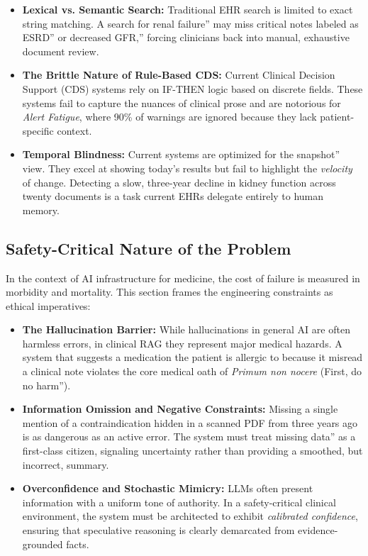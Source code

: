 \begin{itemize} \item \textbf{Lexical vs. Semantic Search:} Traditional EHR search is limited to exact string matching. A search for renal failure'' may miss critical notes labeled as ESRD'' or decreased GFR,'' forcing clinicians back into manual, exhaustive document review. \item \textbf{The Brittle Nature of Rule-Based CDS:} Current Clinical Decision Support (CDS) systems rely on IF-THEN logic based on discrete fields. These systems fail to capture the nuances of clinical prose and are notorious for \textit{Alert Fatigue}, where 90\% of warnings are ignored because they lack patient-specific context. \item \textbf{Temporal Blindness:} Current systems are optimized for the snapshot'' view. They excel at showing today's results but fail to highlight the \textit{velocity} of change. Detecting a slow, three-year decline in kidney function across twenty documents is a task current EHRs delegate entirely to human memory. \end{itemize}

\subsection{Safety-Critical Nature of the Problem} In the context of AI infrastructure for medicine, the cost of failure is measured in morbidity and mortality. This section frames the engineering constraints as ethical imperatives:
\begin{itemize}

    \item \textbf{The Hallucination Barrier:} While hallucinations in general AI are often harmless errors, in clinical RAG they represent major medical hazards. A system that suggests a medication the patient is allergic to because it misread a clinical note violates the core medical oath of \textit{Primum non nocere} (First, do no harm''). 

\item \textbf{Information Omission and Negative Constraints:} Missing a single mention of a contraindication hidden in a scanned PDF from three years ago is as dangerous as an active error. The system must treat missing data'' as a first-class citizen, signaling uncertainty rather than providing a smoothed, but incorrect, summary. \item \textbf{Overconfidence and Stochastic Mimicry:} LLMs often present information with a uniform tone of authority. In a safety-critical clinical environment, the system must be architected to exhibit \textit{calibrated confidence}, ensuring that speculative reasoning is clearly demarcated from evidence-grounded facts. \end{itemize}



